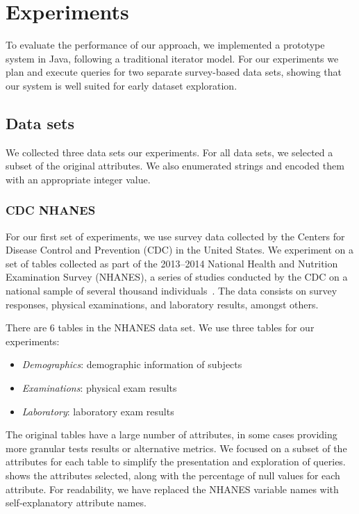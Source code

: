 \newcommand{\demorows}{10175}
\newcommand{\labexrows}{9813}

\section{Experiments}\label{sec:experiments}
To evaluate the performance of our approach,  we implemented
a prototype system in Java, following a traditional iterator model.
For our experiments we plan and execute queries
for two separate survey-based data sets, showing that our system
is well suited for early dataset exploration.

\subsection{Data sets} \label{subsec:datasets}
We collected three data sets our experiments.
For all data sets, we selected a subset of the original attributes.
We also enumerated strings and encoded them with an appropriate integer value.

\subsubsection{CDC NHANES}
For our first set of experiments, we use survey data collected by the 
Centers for Disease Control and Prevention (CDC) in the United States. We
experiment on a set of tables collected as part of the 2013--2014 National
Health and Nutrition Examination Survey (NHANES), a series of studies
conducted by the CDC on a national sample of several thousand individuals~\cite{cdc-data}.
The data consists on survey responses, physical examinations, and laboratory
results, amongst others.

There are 6 tables in the NHANES data set. We use three tables for our experiments:

\begin{itemize}
	\item \emph{Demographics}: demographic information of subjects
	\item \emph{Examinations}: physical exam results
	\item \emph{Laboratory}: laboratory exam results
\end{itemize}

The original tables have a large number of attributes, in some cases providing more granular tests results or alternative metrics.
We focused on a subset of the attributes for each table to simplify the presentation and exploration of queries.
 shows the attributes selected, along with the percentage of null values for each attribute.
For readability, we have replaced the NHANES variable names with self-explanatory attribute names.

